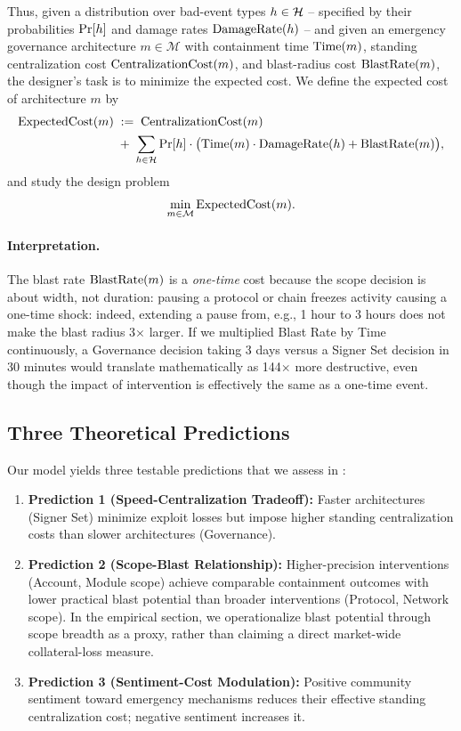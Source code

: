 \documentclass[12pt]{article}
\newif\ifconcise
\begin{document}
Thus, given a distribution over bad-event types $h\in\mathcal{H}$ -- specified by their probabilities $\Pr[h]$ and damage rates $\mathrm{DamageRate}(h)$ -- and given an emergency governance architecture $m\in\mathcal{M}$ with containment time $\mathrm{Time}(m)$, standing centralization cost $\mathrm{CentralizationCost}(m)$, and blast-radius cost $\mathrm{BlastRate}(m)$, the designer's task is to minimize the expected cost.
We define the expected cost of architecture $m$ by
\begin{align*}
\mathrm{ExpectedCost}(m)
&\;:=\;
\mathrm{CentralizationCost}(m) \\
&\;+\;
\sum_{h\in\mathcal{H}}\Pr[h]\cdot
\big(\mathrm{Time}(m)\cdot\mathrm{DamageRate}(h) + \mathrm{BlastRate}(m)\big),
\end{align*}
and study the design problem
\[
\min_{m\in\mathcal{M}} \mathrm{ExpectedCost}(m).
\]

\ifconcise\else
\paragraph{Interpretation.}
The blast rate $\mathrm{BlastRate}(m)$ is a \emph{one-time} cost because the scope decision is about width, not duration: pausing a protocol or chain freezes activity causing a one-time shock: indeed, extending a pause from, e.g., 1 hour to 3 hours does not make the blast radius 3$\times$ larger. If we multiplied Blast Rate by Time continuously, a Governance decision taking 3 days versus a Signer Set decision in 30 minutes would translate mathematically as 144$\times$ more destructive, even though the impact of intervention is effectively the same as a one-time event.
\fi


\subsection{Three Theoretical Predictions}
\label{subsec:predictions}

Our model yields three testable predictions that we assess in :

\begin{enumerate}
    \item \textbf{Prediction 1 (Speed-Centralization Tradeoff):} Faster architectures (Signer Set) minimize exploit losses but impose higher standing centralization costs than slower architectures (Governance).
    \item \textbf{Prediction 2 (Scope-Blast Relationship):} Higher-precision interventions (Account, Module scope) achieve comparable containment outcomes with lower practical blast potential than broader interventions (Protocol, Network scope). In the empirical section, we operationalize blast potential through scope breadth as a proxy, rather than claiming a direct market-wide collateral-loss measure.
    \item \textbf{Prediction 3 (Sentiment-Cost Modulation):} Positive community sentiment toward emergency mechanisms reduces their effective standing centralization cost; negative sentiment increases it.
\end{enumerate}
\end{document}
